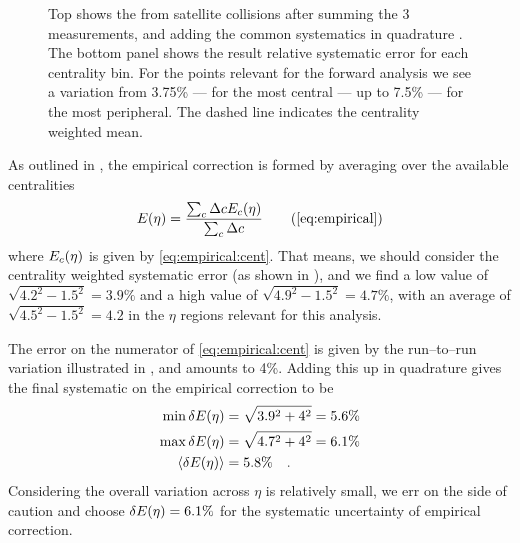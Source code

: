 \begin{figure}[h!tbp]
  \centering
  \caption{Top shows the \ndndeta{} from satellite collisions after
    summing the 3 measurements, and adding the common systematics in
    quadrature \cite{Abbas:2013bpa}.  The bottom panel shows the
    result relative systematic error for each centrality bin. For the
    points relevant for the forward analysis we see a variation from
    3.75\% --- for the most central --- up to 7.5\% --- for the most
    peripheral.  The dashed line indicates the centrality weighted
    mean. }
  \label{fig:dndeta:sat:results}
\end{figure}

As outlined in , the empirical correction is
formed by averaging over the available centralities 
\begin{equation}
  \EmpCor{} = \frac{\sum_c \Delta c\EmpCor[c]{}}{\sum_c \Delta c}
  \tag{\ref{eq:empirical}}
\end{equation}
where $\EmpCor[c]{}$ is given by \eqref{eq:empirical:cent}.  That
means, we should consider the centrality weighted systematic error (as
shown in ), and we find a low value of
$\sqrt{4.2^2-1.5^2}=3.9\%$ and a high value of
$\sqrt{4.9^2-1.5^2}=4.7\%$, with an average of
$\sqrt{4.5^2-1.5^2}=4.2$ in the $\eta$ regions relevant for this
analysis. 

The error on the numerator of \eqref{eq:empirical:cent} is given by
the run--to--run variation illustrated in
, and amounts to 4\%.  Adding this
up in quadrature gives the final systematic on the empirical
correction to be 
\begin{align}
  \label{eq:empcorr:syserr}
  \min{\delta\EmpCor{}} &= \sqrt{3.9^2+4^2} = 5.6\%\nonumber\\
  \max{\delta\EmpCor{}} &= \sqrt{4.7^2+4^2} = 6.1\%\nonumber\\
  \langle\delta\EmpCor{}\rangle &= 5.8\%\quad.\\
\end{align}
Considering the overall variation across $\eta$ is relatively small,
we err on the side of caution and choose $\delta\EmpCor{}=6.1\%$ for
the systematic uncertainty of empirical correction.

